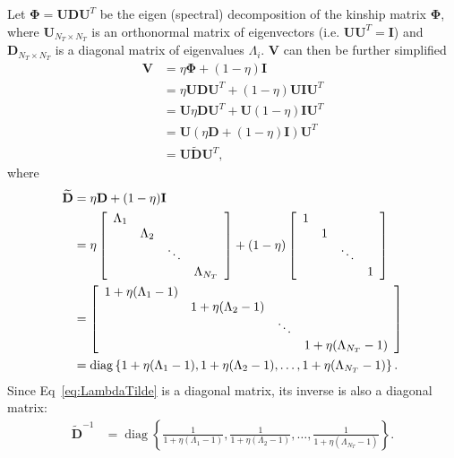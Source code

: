 \documentclass[10pt,letterpaper]{article}
\newcommand{\bD}{\textbf{D}}
\newcommand{\bU}{\textbf{U}}
\newcommand{\bV}{\textbf{V}}
\newcommand{\bI}{\textbf{I}}
\newcommand{\bPhi}{\boldsymbol{\Phi}}
\DeclareMathOperator{\diag}{diag} %
\begin{document}
Let $\bPhi = \bU \bD \bU^T$ be the eigen (spectral) decomposition of the kinship matrix $\bPhi$, where $\bU_{N_T \times N_T}$ is an orthonormal matrix of eigenvectors (i.e. $\bU \bU^T = \bI$) and $\bD_{N_T \times N_T}$ is a diagonal matrix of eigenvalues $\Lambda_i$. $\bV$ can then be further simplified~\cite{pirinen2013efficient}
\begin{align}
\bV & = \eta \bPhi + (1-\eta) \bI \nonumber \\
& = \eta \bU \bD \bU^T + (1-\eta) \bU \bI \bU^T \nonumber \\
& = \bU \eta  \bD \bU^T + \bU (1-\eta) \bI \bU^T \nonumber \\
& = \bU \left(\eta  \bD + (1-\eta) \bI\right) \bU^T \nonumber \\
& = \bU \widetilde{\bD} \bU^T  \label{eq:Vsimplified},
\end{align}
where
\begin{align}
\widetilde{\bD} & = \eta  \bD + (1-\eta) \bI  \label{eq:LambdaTilde} \\
& =  \eta \left[ \begin{array}{cccc}
\Lambda_1 & \hfill & \hfill & \hfill  \\
\hfill & \Lambda_2 & \hfill & \hfill  \\
\hfill & \hfill & \ddots &\hfill  \\
\hfill & \hfill & \hfill & \Lambda_{N_T}  \\
\end{array} \right] + (1-\eta) \left[ \begin{array}{cccc}
1 & \hfill & \hfill & \hfill  \\
\hfill & 1 & \hfill & \hfill  \\
\hfill & \hfill & \ddots &\hfill  \\
\hfill & \hfill & \hfill & 1  \\
\end{array} \right]  \nonumber \\
& =   \left[ \begin{array}{cccc}
1 + \eta (\Lambda_1-1) & \hfill & \hfill & \hfill  \\
\hfill & 1 + \eta (\Lambda_2-1) & \hfill & \hfill  \\
\hfill & \hfill & \ddots &\hfill  \\
\hfill & \hfill & \hfill & 1 + \eta (\Lambda_{N_T}-1)  \\
\end{array} \right]   \nonumber \\
& = \diag\left\lbrace 1 + \eta (\Lambda_1-1), 1 + \eta (\Lambda_2-1), \ldots, 1 + \eta (\Lambda_{N_T}-1) \label{eq:DiagLambda} \right\rbrace.
\end{align}
Since Eq~\ref{eq:LambdaTilde} is a diagonal matrix, its inverse is also a diagonal matrix:
\begin{align}
\widetilde{\bD}^{-1} & = \diag\left\lbrace \frac{1}{1 + \eta (\Lambda_1-1)}, \frac{1}{1 + \eta (\Lambda_2-1)}, \ldots, \frac{1}{1 + \eta (\Lambda_{N_T}-1)} \label{eq:DiagInvLambda} \right\rbrace.
\end{align}
\end{document}
